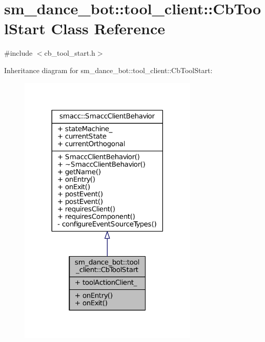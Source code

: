 \hypertarget{classsm__dance__bot_1_1tool__client_1_1CbToolStart}{}\section{sm\+\_\+dance\+\_\+bot\+:\+:tool\+\_\+client\+:\+:Cb\+Tool\+Start Class Reference}
\label{classsm__dance__bot_1_1tool__client_1_1CbToolStart}


{\ttfamily \#include $<$cb\+\_\+tool\+\_\+start.\+h$>$}



Inheritance diagram for sm\+\_\+dance\+\_\+bot\+:\+:tool\+\_\+client\+:\+:Cb\+Tool\+Start\+:
\nopagebreak
\begin{figure}[H]
\begin{center}
\leavevmode
\includegraphics[width=242pt]{classsm__dance__bot_1_1tool__client_1_1CbToolStart__inherit__graph}
\end{center}
\end{figure}


